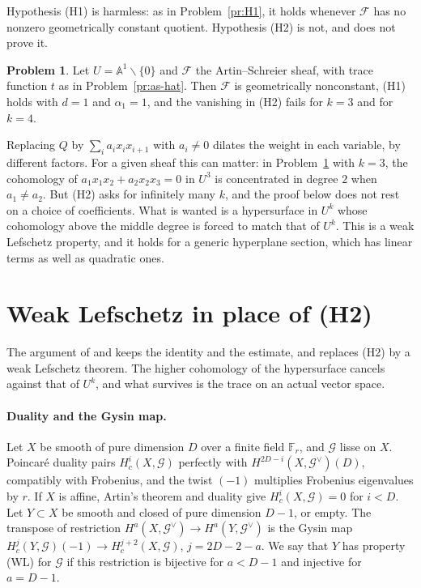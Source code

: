 \documentclass[reqno]{amsart}
\theoremstyle{definition}
\newtheorem{problem}{Problem}[section]
\theoremstyle{plain}
\newcommand{\F}{\mathbb{F}}
\newcommand{\A}{\mathbb{A}}
\newcommand{\cF}{\mathcal{F}}
\newcommand{\cG}{\mathcal{G}}
\begin{document}
Hypothesis (H1) is harmless: as in Problem~\ref{pr:H1}, it holds whenever \(\cF\) has no nonzero geometrically constant quotient.  Hypothesis (H2) is not, and \cite{Dup} does not prove it.

\begin{problem}\label{pr:fail}
Let \(U = \A^1 \smallsetminus \{0\}\) and \(\cF\) the Artin--Schreier sheaf, with trace function \(t\) as in Problem~\ref{pr:as-hat}.  Then \(\cF\) is geometrically nonconstant, (H1) holds with \(d = 1\) and \(\alpha_1 = 1\), and the vanishing in (H2) fails for \(k = 3\) and for \(k = 4\).
\end{problem}

Replacing \(Q\) by \(\sum_i a_ix_ix_{i+1}\) with \(a_i \ne 0\) dilates the weight in each variable, by different factors.  For a given sheaf this can matter: in Problem~\ref{pr:fail} with \(k = 3\), the cohomology of \(a_1x_1x_2 + a_2x_2x_3 = 0\) in \(U^3\) is concentrated in degree \(2\) when \(a_1 \ne a_2\).  But (H2) asks for infinitely many \(k\), and the proof below does not rest on a choice of coefficients.  What is wanted is a hypersurface in \(U^k\) whose cohomology above the middle degree is forced to match that of \(U^k\).  This is a weak Lefschetz property, and it holds for a generic hyperplane section, which has linear terms as well as quadratic ones.

\section{Weak Lefschetz in place of (H2)}\label{sec:curves}

The argument of \cite{Ald} and \cite{Zh} keeps the identity and the estimate, and replaces (H2) by a weak Lefschetz theorem.  The higher cohomology of the hypersurface cancels against that of \(U^k\), and what survives is the trace on an actual vector space.

\paragraph{Duality and the Gysin map.}
Let \(X\) be smooth of pure dimension \(D\) over a finite field \(\F_r\), and \(\cG\) lisse on \(X\).  Poincar\'e duality pairs \(H^i_c(X, \cG)\) perfectly with \(H^{2D-i}(X, \cG^\vee)(D)\), compatibly with Frobenius, and the twist \((-1)\) multiplies Frobenius eigenvalues by \(r\).  If \(X\) is affine, Artin's theorem and duality give \(H^i_c(X, \cG) = 0\) for \(i < D\).  Let \(Y \subset X\) be smooth and closed of pure dimension \(D - 1\), or empty.  The transpose of restriction \(H^a(X, \cG^\vee) \to H^a(Y, \cG^\vee)\) is the Gysin map \(H^j_c(Y, \cG)(-1) \to H^{j+2}_c(X, \cG)\), \(j = 2D - 2 - a\).  We say that \(Y\) has property (WL) for \(\cG\) if this restriction is bijective for \(a < D - 1\) and injective for \(a = D - 1\).
\end{document}
